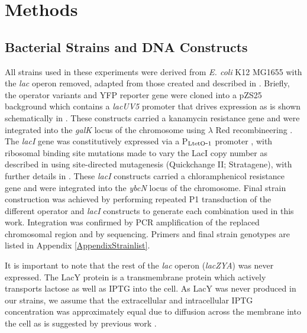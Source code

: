 \section*{Methods} \label{section_methods}

\subsection*{Bacterial Strains and DNA Constructs}

All strains used in these experiments were derived from \textit{E. coli} K12
MG1655 with the \textit{lac} operon removed, adapted from those created and
described in \textcite{Garcia2011, Garcia2011B}. Briefly, the operator variants
and YFP reporter gene were cloned into a pZS25 background which contains a
\textit{lacUV5} promoter that drives expression as is shown schematically in
. These constructs carried a kanamycin
resistance gene and were integrated into the \textit{galK} locus of the
chromosome using $\lambda$ Red recombineering \citep{Sharan2009}. The
\textit{lacI} gene was constitutively expressed via a
P$_\mathrm{LtetO\hbox{-}1}$ promoter \citep{Lutz1997}, with ribosomal binding
site mutations made to vary the LacI copy number as described in
\textcite{Salis2009} using site-directed mutagenesis (Quickchange II;
Stratagene), with further details in \textcite{Garcia2011}. These {\it lacI}
constructs carried a chloramphenicol resistance gene and were integrated into
the \textit{ybcN} locus of the chromosome. Final strain construction was
achieved by performing repeated P1 transduction \citep{Thomason2007} of the
different operator and \textit{lacI} constructs to generate each combination
used in this work. Integration was confirmed by PCR amplification of the
replaced chromosomal region and by sequencing. Primers and final strain
genotypes are listed in Appendix \ref{AppendixStrainlist}.

It is important to note that the rest of the \textit{lac} operon
(\textit{lacZYA}) was never expressed. The LacY protein is a transmembrane
protein which actively transports lactose as well as IPTG into the cell. As LacY
was never produced in our strains, we assume that the extracellular and
intracellular IPTG concentration was approximately equal due to diffusion across
the membrane into the cell as is suggested by previous work
\citep{FernandezCastane2012}.

